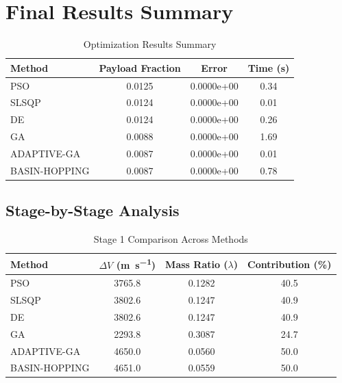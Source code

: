 \documentclass{article}
\begin{document}
\section{Final Results Summary}
\begin{table}[H]
\centering
\caption{Optimization Results Summary}
\begin{tabular}{lS[table-format=1.4]S[table-format=1.4e-1]S[table-format=1.2]}
\toprule
Method & {Payload Fraction} & {Error} & {Time (\si{\second})} \\
\midrule
PSO          & 0.0125 & 0.0000e+00 & 0.34 \\
SLSQP        & 0.0124 & 0.0000e+00 & 0.01 \\
DE           & 0.0124 & 0.0000e+00 & 0.26 \\
GA           & 0.0088 & 0.0000e+00 & 1.69 \\
ADAPTIVE-GA  & 0.0087 & 0.0000e+00 & 0.01 \\
BASIN-HOPPING & 0.0087 & 0.0000e+00 & 0.78 \\
\bottomrule
\end{tabular}
\end{table}

\subsection{Stage-by-Stage Analysis}


\begin{table}[H]
\centering
\caption{Stage 1 Comparison Across Methods}
\begin{tabular}{lS[table-format=4.1]S[table-format=1.4]S[table-format=3.1]}
\toprule
Method & {$\Delta V$ (\si{\meter\per\second})} & {Mass Ratio ($\lambda$)} & {Contribution (\%)} \\
\midrule
PSO          & 3765.8 & 0.1282 & 40.5 \\
SLSQP        & 3802.6 & 0.1247 & 40.9 \\
DE           & 3802.6 & 0.1247 & 40.9 \\
GA           & 2293.8 & 0.3087 & 24.7 \\
ADAPTIVE-GA  & 4650.0 & 0.0560 & 50.0 \\
BASIN-HOPPING & 4651.0 & 0.0559 & 50.0 \\
\bottomrule
\end{tabular}
\end{table}
\end{document}

